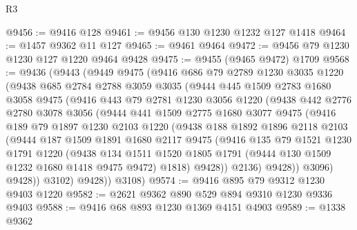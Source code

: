 \begin{lexlean}{R3}
\begin{coremodule}
@9456 := @9416 @128
@9461 := @9456 @130 @1230 @1232 @127 @1418
@9464 := @1457 @9362 @11 @127
@9465 := @9461 @9464
@9472 := @9456 @79 @1230 @1230 @127 @1220 @9464 @9428
@9475 := @9455 (@9465 @9472) @1709
@9568 := @9436
    (@9443
      (@9449
        @9475
        (@9416
          @686
          @79
          @2789
          @1230
          @3035
          @1220
          (@9438
            @685
            @2784
            @2788
            @3059
            @3035
            (@9444
              @445
              @1509
              @2783
              @1680
              @3058
              @9475
              (@9416
                @443
                @79
                @2781
                @1230
                @3056
                @1220
                (@9438
                  @442
                  @2776
                  @2780
                  @3078
                  @3056
                  (@9444
                    @441
                    @1509
                    @2775
                    @1680
                    @3077
                    @9475
                    (@9416
                      @189
                      @79
                      @1897
                      @1230
                      @2103
                      @1220
                      (@9438
                        @188
                        @1892
                        @1896
                        @2118
                        @2103
                        (@9444
                          @187
                          @1509
                          @1891
                          @1680
                          @2117
                          @9475
                          (@9416
                            @135
                            @79
                            @1521
                            @1230
                            @1791
                            @1220
                            (@9438
                              @134
                              @1511
                              @1520
                              @1805
                              @1791
                              (@9444 @130 @1509 @1232 @1680 @1418 @9475 @9472)
                              @1818)
                            @9428))
                        @2136)
                      @9428))
                  @3096)
                @9428))
            @3102)
          @9428))
      @3108)
@9574 := @9416 @895 @79 @9312 @1230 @9403 @1220
@9582 := @2621 @9362 @890 @529 @894 @9310 @1230 @9336 @9403
@9588 := @9416 @68 @893 @1230 @1369 @4151 @4903
@9589 := @1338 @9362

\end{coremodule}
\end{lexlean}
